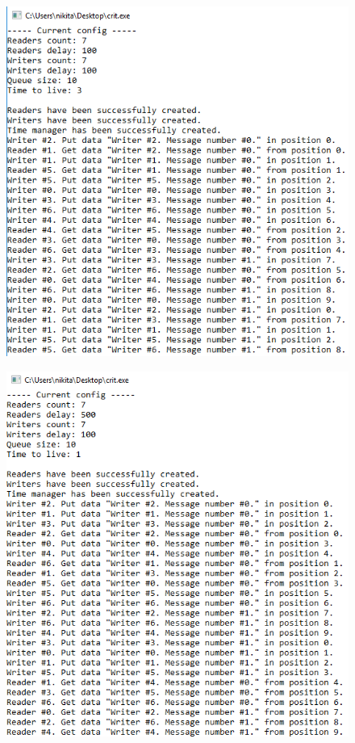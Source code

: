 \documentclass[14pt,a4paper,report]{report}
\begin{document}
\begin{figure}[h!]
	\centering
	\includegraphics[scale = 0.75]{images/p1_4_1.png}
	
	\caption{}
	\label{image:7}
\end{figure}

\begin{figure}[h!]
	\centering
	\includegraphics[scale = 0.75]{images/p1_4_2.png}
	
	\caption{}
	\label{image:8}
\end{figure}
\end{document}
